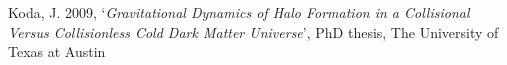 



\renewcommand{\refname}{PhD Thesis}
\begin{thebibliography}{8}
{Koda}, J. 2009, `{\it Gravitational Dynamics of Halo Formation in a Collisional
  Versus Collisionless Cold Dark Matter Universe}', PhD thesis, The University
  of Texas at Austin
\end{thebibliography}





